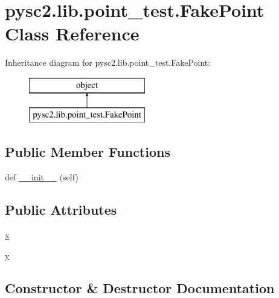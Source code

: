 \hypertarget{classpysc2_1_1lib_1_1point__test_1_1_fake_point}{}\section{pysc2.\+lib.\+point\+\_\+test.\+Fake\+Point Class Reference}
\label{classpysc2_1_1lib_1_1point__test_1_1_fake_point}
Inheritance diagram for pysc2.\+lib.\+point\+\_\+test.\+Fake\+Point\+:\begin{figure}[H]
\begin{center}
\leavevmode
\includegraphics[height=2.000000cm]{classpysc2_1_1lib_1_1point__test_1_1_fake_point}
\end{center}
\end{figure}
\subsection*{Public Member Functions}
\begin{DoxyCompactItemize}
\item 
def \mbox{\hyperlink{classpysc2_1_1lib_1_1point__test_1_1_fake_point_a477a3ccac64bf883f4302776c25e64fd}{\+\_\+\+\_\+init\+\_\+\+\_\+}} (self)
\end{DoxyCompactItemize}
\subsection*{Public Attributes}
\begin{DoxyCompactItemize}
\item 
\mbox{\hyperlink{classpysc2_1_1lib_1_1point__test_1_1_fake_point_af44ff09f18ad5a5f4788e5d0cc8e28aa}{x}}
\item 
\mbox{\hyperlink{classpysc2_1_1lib_1_1point__test_1_1_fake_point_abdf10860fd63baac01c2c3e12833876b}{y}}
\end{DoxyCompactItemize}


\subsection{Constructor \& Destructor Documentation}
\mbox{\label{classpysc2_1_1lib_1_1point__test_1_1_fake_point_a477a3ccac64bf883f4302776c25e64fd}} 
